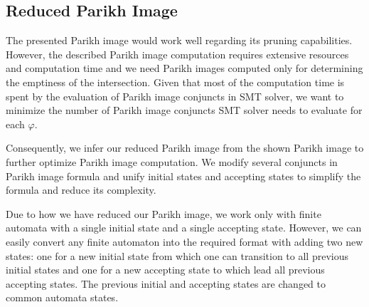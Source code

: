 \subsection{Reduced Parikh Image}\label{sec:reducedParikhImage}

The presented Parikh image would work well regarding its pruning capabilities. However, the described Parikh image computation requires extensive resources and computation time and we need Parikh images computed only for determining the emptiness of the intersection. Given that most of the computation time is spent by the evaluation of Parikh image conjuncts in SMT solver, we want to minimize the number of Parikh image conjuncts SMT solver needs to evaluate for each $\varphi$.

Consequently, we infer our reduced Parikh image from the shown Parikh image to further optimize Parikh image computation. We modify several conjuncts in Parikh image formula and unify initial states and accepting states to simplify the formula and reduce its complexity.

Due to how we have reduced our Parikh image, we work only with finite automata with a single initial state and a single accepting state. However, we can easily convert any finite automaton into the required format with adding two new states: one for a new initial state from which one can transition to all previous initial states and one for a new accepting state to which lead all previous accepting states. The previous initial and accepting states are changed to common automata states.



